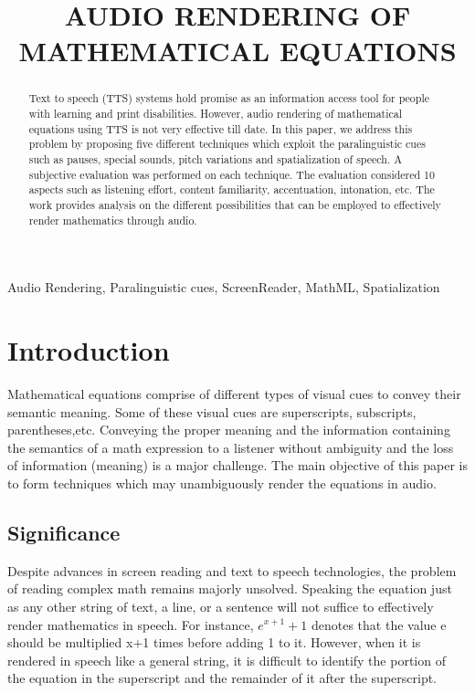 \documentclass{article}
\title{AUDIO RENDERING OF MATHEMATICAL EQUATIONS}
\begin{document}
%
\maketitle
%
\begin{abstract}

Text to speech (TTS) systems hold promise as an information access tool for people with learning and print disabilities. However, audio rendering of mathematical equations using TTS is not very effective till date. In this paper, we address this problem by proposing five different techniques which exploit the paralinguistic cues such as pauses, special sounds, pitch variations and spatialization of speech. A subjective evaluation was performed on each technique. The evaluation considered 10 aspects such as listening effort, content familiarity, accentuation, intonation, etc. The work provides analysis on the different possibilities that can be employed to effectively render mathematics through audio.


\end{abstract}
%
\begin{keywords}
 Audio Rendering, Paralinguistic cues, ScreenReader, MathML, Spatialization
\end{keywords}
%
\section{Introduction}
\label{sec:intro}
Mathematical equations comprise of different types of visual cues to convey their semantic meaning. Some of these visual cues are superscripts, subscripts, parentheses,etc. Conveying the proper meaning and the information containing the semantics of a math expression to a listener without ambiguity and the loss of information (meaning) is a major challenge. The main objective of this paper is to form techniques which may unambiguously render the equations in audio. 


\subsection{Significance}
\label{ssec:intro}




Despite advances in screen reading and text to speech technologies, the problem of reading complex math remains majorly unsolved. Speaking the equation just as any other string of text, a line, or a sentence will not suffice to effectively render mathematics in speech. For instance, $e^{x+1}+1$ denotes that the value e should be multiplied x+1 times before adding 1 to it. However, when it is rendered in speech like a general string, it is difficult to identify the portion of the equation in the superscript and the remainder of it after the superscript.
\end{document}
